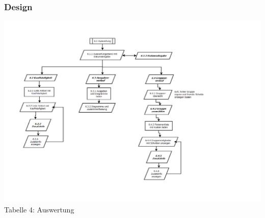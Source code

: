\documentclass[12pt,a4paper]{article}
\begin{document}
\subsubsection*{Design}
\hspace*{-10mm} 
\includegraphics[trim = 20mm 60mm 0mm 20mm,clip,scale=0.9]{Auswertung.pdf}
\footnotesize Tabelle 4: Auswertung
\normalsize
\\
\end{document}
